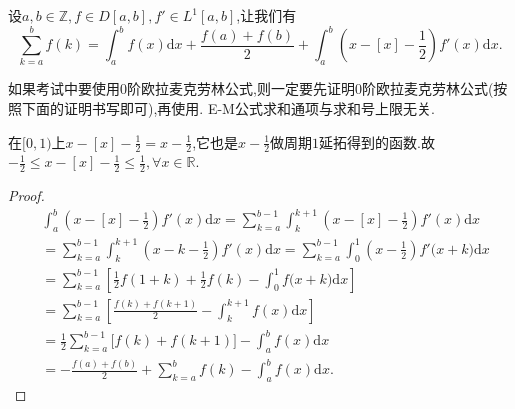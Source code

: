 \documentclass[../../main.tex]{subfiles}%
\begin{document}
\begin{theorem}\label{theorem:0阶Euler-Maclaurin公式(0阶E-M公式)}
设\(a,b\in\mathbb{Z}, f\in D[a,b], f'\in L^1[a,b]\),让我们有
\[
\sum\limits_{k = a}^{b}f(k)=\int_{a}^{b}f(x)\mathrm{d}x+\frac{f(a)+f(b)}{2}+\int_{a}^{b}\left(x - [x]-\frac{1}{2}\right)f'(x)\mathrm{d}x.
\]
\end{theorem}
\begin{remark}
如果考试中要使用0阶欧拉麦克劳林公式,则一定要先证明0阶欧拉麦克劳林公式(按照下面的证明书写即可),再使用.
E-M公式求和通项与求和号上限无关.
\end{remark}
\begin{note}
在\([0,1)\)上\(x - [x]-\frac{1}{2}=x - \frac{1}{2}\),它也是\(x - \frac{1}{2}\)做周期\(1\)延拓得到的函数.故$-\frac{1}{2}\leqslant x-[x]-\frac{1}{2}\leqslant \frac{1}{2},\forall x\in \mathbb{R} .$
\end{note}
\begin{proof}

\begin{align*}
&\int_a^b{\left( x-[x]-\frac{1}{2} \right) f'(x)\mathrm{d}x}=\sum\limits_{k=a}^{b-1}{\int_k^{k+1}{\left( x-[x]-\frac{1}{2} \right) f'(x)\mathrm{d}x}}
\\
&=\sum\limits_{k=a}^{b-1}{\int_k^{k+1}{\left( x-k-\frac{1}{2} \right) f'(x)\mathrm{d}x}}=\sum\limits_{k=a}^{b-1}{\int_0^1{\left( x-\frac{1}{2} \right) f'(x}}+k)\mathrm{d}x
\\
&=\sum\limits_{k=a}^{b-1}{\left[ \frac{1}{2}f(1+k)+\frac{1}{2}f(k)-\int_0^1{f(x}+k)\mathrm{d}x \right]}
\\
&=\sum\limits_{k=a}^{b-1}{\left[ \frac{f(k)+f(k+1)}{2}-\int_k^{k+1}{f(x)\mathrm{d}x} \right]}
\\
&=\frac{1}{2}\sum\limits_{k=a}^{b-1}{[f(k)}+f(k+1)]-\int_a^b{f(x)\mathrm{d}x}
\\
&=-\frac{f(a)+f(b)}{2}+\sum\limits_{k=a}^b{f(k)}-\int_a^b{f(x)\mathrm{d}x}.
\end{align*}

\end{proof}
\end{document}
